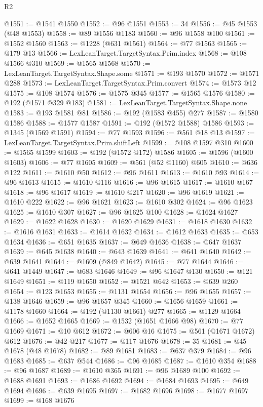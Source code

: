 \begin{lexlean}{R2}
\begin{coremodule}
@1551 := @1541 @1550
@1552 := @96 @1551
@1553 := 34
@1556 := @45 @1553 (@48 @1553)
@1558 := @89 @1556 @1183
@1560 := @96 @1558 @100
@1561 := @1552 @1560
@1563 := @1228 (@631 @1561)
@1564 := @77 @1563
@1565 := @179 @13
@1566 := LexLeanTarget.TargetSyntax.Prim.index
@1568 := @108 @1566 @310
@1569 := @1565 @1568
@1570 := LexLeanTarget.TargetSyntax.Shape.some
@1571 := @193 @1570
@1572 := @1571 @288
@1573 := LexLeanTarget.TargetSyntax.Prim.convert
@1574 := @1573 @12
@1575 := @108 @1574
@1576 := @1575 @345
@1577 := @1565 @1576
@1580 := @192 (@1571 @329 @183)
@1581 := LexLeanTarget.TargetSyntax.Shape.none
@1583 := @193 @1581 @81
@1586 := @192 (@1583 @455) @277
@1587 := @1580 @1586
@1588 := @1577 @1587
@1591 := @192 (@1572 @1588) @1586
@1593 := @1345 (@1569 @1591)
@1594 := @77 @1593
@1596 := @561 @18 @13
@1597 := LexLeanTarget.TargetSyntax.Prim.shiftLeft
@1599 := @108 @1597 @310
@1600 := @1565 @1599
@1603 := @192 (@1572 @172) @1586
@1605 := @1596 (@1600 @1603)
@1606 := @77 @1605
@1609 := @561 (@52 @1160) @605
@1610 := @636 @122
@1611 := @1610 @50
@1612 := @96 @1611
@1613 := @1610 @93
@1614 := @96 @1613
@1615 := @1610 @116
@1616 := @96 @1615
@1617 := @1610 @167
@1618 := @96 @1617
@1619 := @1610 @217
@1620 := @96 @1619
@1621 := @1610 @222
@1622 := @96 @1621
@1623 := @1610 @302
@1624 := @96 @1623
@1625 := @1610 @307
@1627 := @96 @1625 @100
@1628 := @1624 @1627
@1629 := @1622 @1628
@1630 := @1620 @1629
@1631 := @1618 @1630
@1632 := @1616 @1631
@1633 := @1614 @1632
@1634 := @1612 @1633
@1635 := @653 @1634
@1636 := @651 @1635
@1637 := @649 @1636
@1638 := @647 @1637
@1639 := @645 @1638
@1640 := @643 @1639
@1641 := @641 @1640
@1642 := @639 @1641
@1644 := @1609 (@849 @1642)
@1645 := @77 @1644
@1646 := @641 @1449
@1647 := @683 @1646
@1649 := @96 @1647 @130
@1650 := @121 @1649
@1651 := @119 @1650
@1652 := @1521 @642
@1653 := @639 @260
@1654 := @123 @1653
@1655 := @1131 @1654
@1656 := @96 @1655
@1657 := @138 @1646
@1659 := @96 @1657 @345
@1660 := @1656 @1659
@1661 := @1178 @1660
@1664 := @192 (@1130 @1661) @277
@1665 := @1129 @1664
@1666 := @1652 @1665
@1669 := @1532 (@1651 @1666 @98)
@1670 := @77 @1669
@1671 := @10 @612
@1672 := @606 @16
@1675 := @561 (@1671 @1672) @612
@1676 := @42 @217
@1677 := @117 @1676
@1678 := 35
@1681 := @45 @1678 (@48 @1678)
@1682 := @89 @1681
@1683 := @637 @379
@1684 := @96 @1683
@1685 := @637 @544
@1686 := @96 @1685
@1687 := @1610 @354
@1688 := @96 @1687
@1689 := @1610 @365
@1691 := @96 @1689 @100
@1692 := @1688 @1691
@1693 := @1686 @1692
@1694 := @1684 @1693
@1695 := @649 @1694
@1696 := @639 @1695
@1697 := @1682 @1696
@1698 := @1677 @1697
@1699 := @168 @1676

\end{coremodule}
\end{lexlean}
